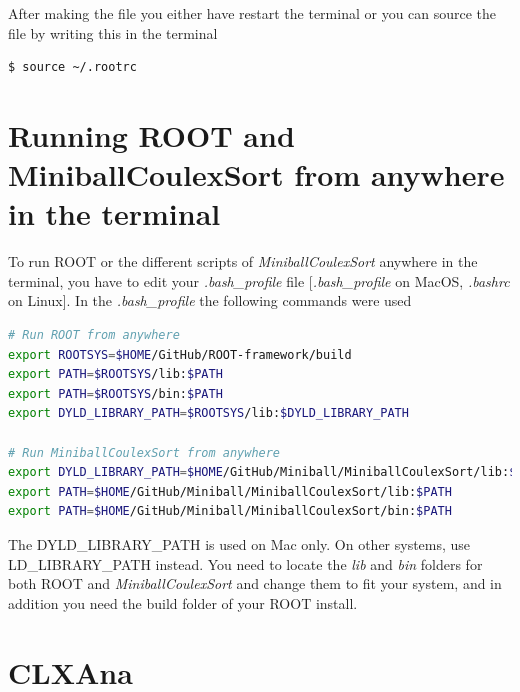 \documentclass[twoside,english]{uiofysmaster/uiofysmaster}
\begin{document}
\begin{appendices}
After making the file you either have restart the terminal or you can source the file by writing this in the terminal
\begin{lstlisting}[language=sh]
$ source ~/.rootrc
\end{lstlisting}


\section{Running ROOT and MiniballCoulexSort from anywhere in the terminal}
To run ROOT or the different scripts of \textsl{MiniballCoulexSort} anywhere in the terminal, you have to edit your \textit{.bash\_profile} file [\textit{.bash\_profile} on MacOS, \textit{.bashrc} on Linux]. In the \textit{.bash\_profile} the following commands were used 
\begin{lstlisting}[language=sh]
# Run ROOT from anywhere
export ROOTSYS=$HOME/GitHub/ROOT-framework/build
export PATH=$ROOTSYS/lib:$PATH
export PATH=$ROOTSYS/bin:$PATH
export DYLD_LIBRARY_PATH=$ROOTSYS/lib:$DYLD_LIBRARY_PATH

# Run MiniballCoulexSort from anywhere
export DYLD_LIBRARY_PATH=$HOME/GitHub/Miniball/MiniballCoulexSort/lib:$DYLD_LIBRARY_PATH
export PATH=$HOME/GitHub/Miniball/MiniballCoulexSort/lib:$PATH
export PATH=$HOME/GitHub/Miniball/MiniballCoulexSort/bin:$PATH
\end{lstlisting}
The DYLD\_LIBRARY\_PATH is used on Mac only. On other systems, use \newline LD\_LIBRARY\_PATH instead. You need to locate the \textit{lib} and \textit{bin} folders for both ROOT and \textsl{MiniballCoulexSort} and change them to fit your system, and in addition you need the build folder of your ROOT install.


\section{CLXAna}\label{sec:CLXAna}


\end{appendices}
\end{document}
